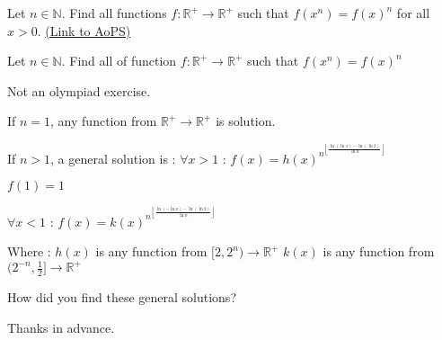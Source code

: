 \begin{problem}
	Let $n \in \mathbb{N}$. Find all functions $f : \mathbb{R}^+ \rightarrow \mathbb{R}^+$ such that $f(x^n)=f(x)^n$ for all $x>0$.
	\flushright \href{https://artofproblemsolving.com/community/c6h384854}{(Link to AoPS)}
\end{problem}



\begin{solution}
	\begin{tcolorbox}Let $n \in \mathbb{N}$. Find all of function $f : \mathbb{R}^+ \rightarrow \mathbb{R}^+$ such that $f(x^n)=f(x)^n$\end{tcolorbox}

Not an olympiad exercise.

If $n=1$, any function from $\mathbb R^+\to \mathbb R^+$ is solution.

If $n>1$, a general solution is :
$\forall x>1$ : $f(x)=h(x)^{n^{\left\lfloor\frac{\ln(\ln x)-\ln(\ln 2)}{\ln n}\right\rfloor}}$ 

$f(1)=1$

$\forall x<1$ : $f(x)=k(x)^{n^{\left\lfloor\frac{\ln(-\ln x)-\ln(\ln 2)}{\ln n}\right\rfloor}}$ 

Where :
$h(x)$ is any function from $[2,2^n)\to\mathbb R^+$
$k(x)$ is any function from $(2^{-n},\frac 12]\to\mathbb R^+$
\end{solution}



\begin{solution}
	How did you find these general solutions?

Thanks in advance.
\end{solution}



